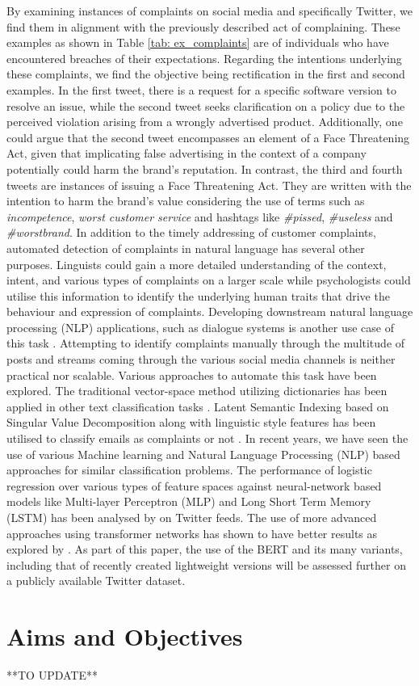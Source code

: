 By examining instances of complaints on social media and specifically Twitter, we find them in alignment with the previously described act of complaining. These examples as shown in Table \ref{tab: ex_complaints} are of individuals who have encountered breaches of their expectations. Regarding the intentions underlying these complaints, we find the objective being rectification in the first and second examples. In the first tweet, there is a request for a specific software version to resolve an issue, while the second tweet seeks clarification on a policy due to the perceived violation arising from a wrongly advertised product. Additionally, one could argue that the second tweet encompasses an element of a Face Threatening Act, given that implicating false advertising in the context of a company potentially could harm the brand's reputation. In contrast, the third and fourth tweets are instances of issuing a Face Threatening Act. They are written with the intention to harm the brand's value considering the use of terms such as \textit{incompetence}, \textit{worst customer service} and hashtags like \textit{\#pissed}, \textit{\#useless} and \textit{\#worstbrand}. 
\newline \newline
In addition to the timely addressing of customer complaints, automated detection of complaints in natural language has several other purposes. Linguists could gain a more detailed understanding of the context, intent, and various types of complaints on a larger scale while psychologists could utilise this information to identify the underlying human traits that drive the behaviour and expression of complaints. Developing downstream natural language processing (NLP) applications, such as dialogue systems is another use case of this task \cite{preotiuc-pietro_automatically_2019}.
\newline \newline
Attempting to identify complaints manually through the multitude of posts and streams coming through the various social media channels is neither practical nor scalable. Various approaches to automate this task have been explored. The traditional vector-space method utilizing dictionaries has been applied in other text classification tasks \cite{liang_dictionary-based_2006}. Latent Semantic Indexing based on Singular Value Decomposition along with linguistic style features has been utilised to classify emails as complaints or not \cite{coussement_improving_2008}. In recent years, we have seen the use of various Machine learning and Natural Language Processing (NLP) based approaches for similar classification problems. The performance of logistic regression over various types of feature spaces against neural-network based models like Multi-layer Perceptron (MLP) and Long Short Term Memory (LSTM) has been analysed by \cite{preotiuc-pietro_automatically_2019} on Twitter feeds. The use of more advanced approaches using transformer networks has shown to have better results as explored by \cite{jin_complaint_2020}. As part of this paper, the use of the BERT and its many variants, including that of recently created lightweight versions will be assessed further on a publicly available Twitter dataset.

\section{Aims and Objectives}

**TO UPDATE**

